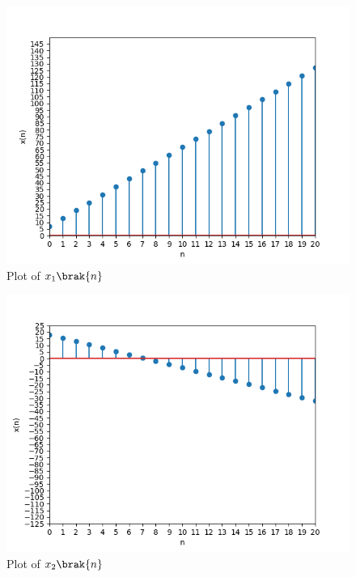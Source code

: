 \documentclass[journal,12pt,twocolumn]{IEEEtran}
\theoremstyle{remark}
\begin{document}
\begin{enumerate}
\begin{figure}[!ht]
\centering
\begin{center}
\includegraphics[width=\columnwidth]{ncert-maths/10/5/2/5/figs/Figure_1}
\caption{Plot of $x_1\brak{n}$}
\end{center}
\end{figure}

\begin{figure}[!ht]
\centering
\begin{center}
\includegraphics[width=\columnwidth]{ncert-maths/10/5/2/5/figs/Figure_2}
\caption{Plot of $x_2\brak{n}$}
\end{center}
\end{figure}

\end{enumerate}
\end{document}
